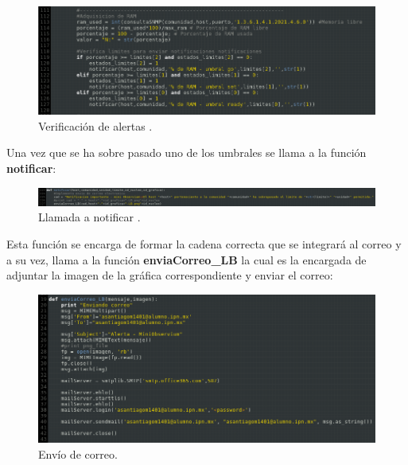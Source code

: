 \FloatBarrier
\begin{figure}[htbp!]
		\centering
			\includegraphics[width=.9 \textwidth]{images/codigo-alerta}
		\caption{Verificación de alertas .}
		\label{image:codigo-alerta}
\end{figure}
\FloatBarrier

Una vez que se ha sobre pasado uno de los umbrales se llama a la función \textbf{notificar}:

\FloatBarrier
\begin{figure}[htbp!]
		\centering
			\includegraphics[width=.9 \textwidth]{images/codigo-notificar}
		\caption{Llamada a notificar .}
		\label{image:codigo-notificar}
\end{figure}
\FloatBarrier

Esta función se encarga de formar la cadena correcta que se integrará al correo y a su vez, llama a la función \textbf{enviaCorreo\_LB} la cual es la encargada de adjuntar la imagen de la gráfica correspondiente y enviar el correo:

\FloatBarrier
\begin{figure}[htbp!]
		\centering
			\includegraphics[width=.9 \textwidth]{images/codigo-correo}
		\caption{Envío de correo.}
		\label{image:codigo-correo}
\end{figure}
\FloatBarrier
